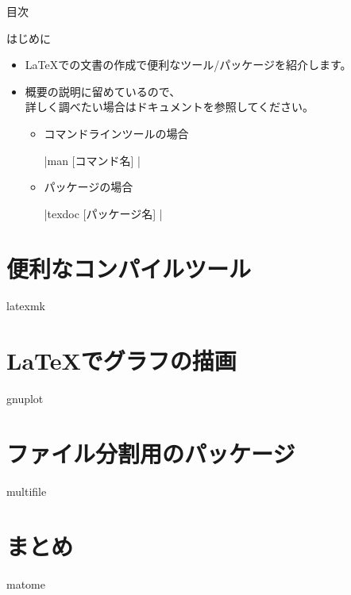 \documentclass[12pt, dvipdfmx]{beamer}
\begin{document}
\maketitle
\begin{frame}{目次}
	\tableofcontents
\end{frame}

\begin{frame}[fragile]{はじめに}
	\begin{itemize}
		\item \LaTeX での文書の作成で便利なツール/パッケージを紹介します。
		\item 概要の説明に留めているので、\\詳しく調べたい場合はドキュメントを参照してください。
			\begin{itemize}
				\item コマンドラインツールの場合 

					|man [コマンド名] |

				\item パッケージの場合 

				  |texdoc [パッケージ名] |

		\end{itemize}
	\end{itemize}
\end{frame}

\section{便利なコンパイルツール}
{latexmk}
\section{\LaTeX でグラフの描画}
{gnuplot}
\section{ファイル分割用のパッケージ}
{multifile}
\section{まとめ}
{matome}
\end{document}

